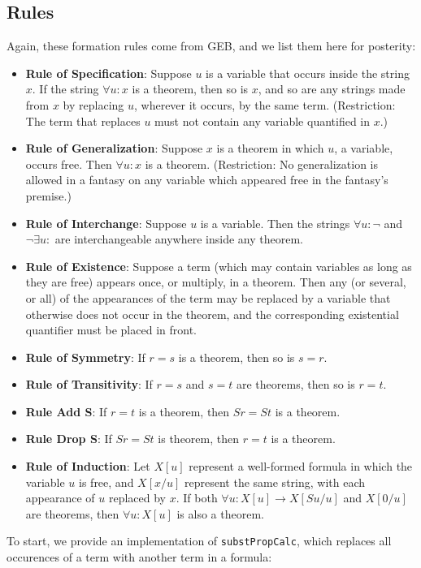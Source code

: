 \documentclass{article}
\begin{document}
\subsection{Rules}

Again, these formation rules come from GEB, and we list them here for posterity:

\begin{itemize}
\item \textbf{Rule of Specification}: Suppose $u$ is a variable that occurs inside the string $x$. If the string $\forall u:x$ is a theorem, then so is $x$, and so are any strings made from $x$ by replacing $u$, wherever it occurs, by the same term. (Restriction: The term that replaces $u$ must not contain any variable quantified in $x$.)
\item \textbf{Rule of Generalization}: Suppose $x$ is a theorem in which $u$, a variable, occurs free. Then $\forall u:x$ is a theorem. (Restriction: No generalization is allowed in a fantasy on any variable which appeared free in the fantasy's premise.)
\item \textbf{Rule of Interchange}: Suppose $u$ is a variable. Then the strings $\forall u:\neg$ and $\neg \exists u:$ are interchangeable anywhere inside any theorem.
\item \textbf{Rule of Existence}: Suppose a term (which may contain variables as long as they are free) appears once, or multiply, in a theorem. Then any (or several, or all) of the appearances of the term may be replaced by a variable that otherwise does not occur in the theorem, and the corresponding existential quantifier must be placed in front.
\item \textbf{Rule of Symmetry}: If $r=s$ is a theorem, then so is $s=r$.
\item \textbf{Rule of Transitivity}: If $r=s$ and $s=t$ are theorems, then so is $r=t$.
\item \textbf{Rule Add S}: If $r=t$ is a theorem, then $Sr=St$ is a theorem.
\item \textbf{Rule Drop S}: If $Sr=St$ is theorem, then $r=t$ is a theorem.
\item \textbf{Rule of Induction}: Let $X[u]$ represent a well-formed formula in which the variable $u$ is free, and $X[x/u]$ represent the same string, with each appearance of $u$ replaced by $x$. If both $\forall u:X[u] \to X[Su/u]$ and $X[0/u]$ are theorems, then $\forall u:X[u]$ is also a theorem.
\end{itemize}

To start, we provide an implementation of \texttt{substPropCalc}, which replaces all occurences of a term with another term in a formula:
\end{document}
